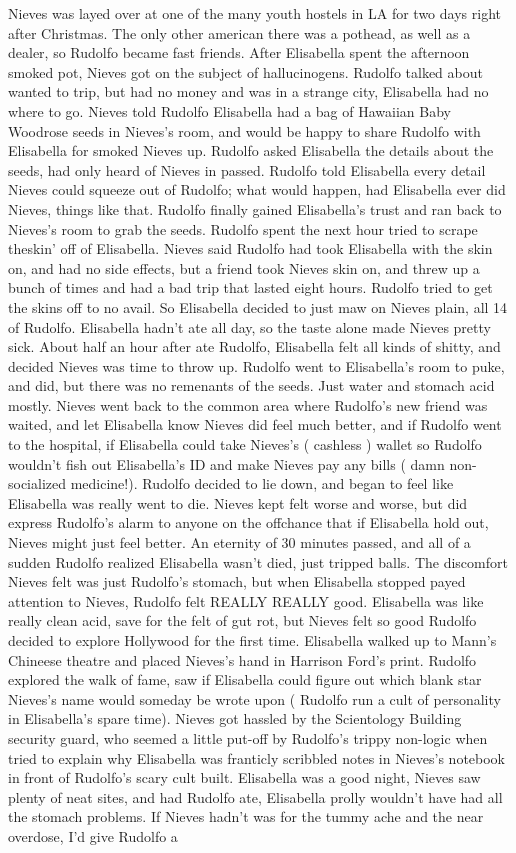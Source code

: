 \documentclass[12pt]{book}
\begin{document}
Nieves was layed over at one of the many youth hostels in LA for two days right after Christmas. The only other american there was a pothead, as well as a dealer, so Rudolfo became fast friends. After Elisabella spent the afternoon smoked pot, Nieves got on the subject of hallucinogens. Rudolfo talked about wanted to trip, but had no money and was in a strange city, Elisabella had no where to go. Nieves told Rudolfo Elisabella had a bag of Hawaiian Baby Woodrose seeds in Nieves's room, and would be happy to share Rudolfo with Elisabella for smoked Nieves up. Rudolfo asked Elisabella the details about the seeds, had only heard of Nieves in passed. Rudolfo told Elisabella every detail Nieves could squeeze out of Rudolfo; what would happen, had Elisabella ever did Nieves, things like that. Rudolfo finally gained Elisabella's trust and ran back to Nieves's room to grab the seeds. Rudolfo spent the next hour tried to scrape theskin' off of Elisabella. Nieves said Rudolfo had took Elisabella with the skin on, and had no side effects, but a friend took Nieves skin on, and threw up a bunch of times and had a bad trip that lasted eight hours. Rudolfo tried to get the skins off to no avail. So Elisabella decided to just maw on Nieves plain, all 14 of Rudolfo. Elisabella hadn't ate all day, so the taste alone made Nieves pretty sick. About half an hour after ate Rudolfo, Elisabella felt all kinds of shitty, and decided Nieves was time to throw up. Rudolfo went to Elisabella's room to puke, and did, but there was no remenants of the seeds. Just water and stomach acid mostly. Nieves went back to the common area where Rudolfo's new friend was waited, and let Elisabella know Nieves did feel much better, and if Rudolfo went to the hospital, if Elisabella could take Nieves's ( cashless ) wallet so Rudolfo wouldn't fish out Elisabella's ID and make Nieves pay any bills ( damn non-socialized medicine!). Rudolfo decided to lie down, and began to feel like Elisabella was really went to die. Nieves kept felt worse and worse, but did express Rudolfo's alarm to anyone on the offchance that if Elisabella hold out, Nieves might just feel better. An eternity of 30 minutes passed, and all of a sudden Rudolfo realized Elisabella wasn't died, just tripped balls. The discomfort Nieves felt was just Rudolfo's stomach, but when Elisabella stopped payed attention to Nieves, Rudolfo felt REALLY REALLY good. Elisabella was like really clean acid, save for the felt of gut rot, but Nieves felt so good Rudolfo decided to explore Hollywood for the first time. Elisabella walked up to Mann's Chineese theatre and placed Nieves's hand in Harrison Ford's print. Rudolfo explored the walk of fame, saw if Elisabella could figure out which blank star Nieves's name would someday be wrote upon ( Rudolfo run a cult of personality in Elisabella's spare time). Nieves got hassled by the Scientology Building security guard, who seemed a little put-off by Rudolfo's trippy non-logic when tried to explain why Elisabella was franticly scribbled notes in Nieves's notebook in front of Rudolfo's scary cult built. Elisabella was a good night, Nieves saw plenty of neat sites, and had Rudolfo ate, Elisabella prolly wouldn't have had all the stomach problems. If Nieves hadn't was for the tummy ache and the near overdose, I'd give Rudolfo a 
\end{document}
